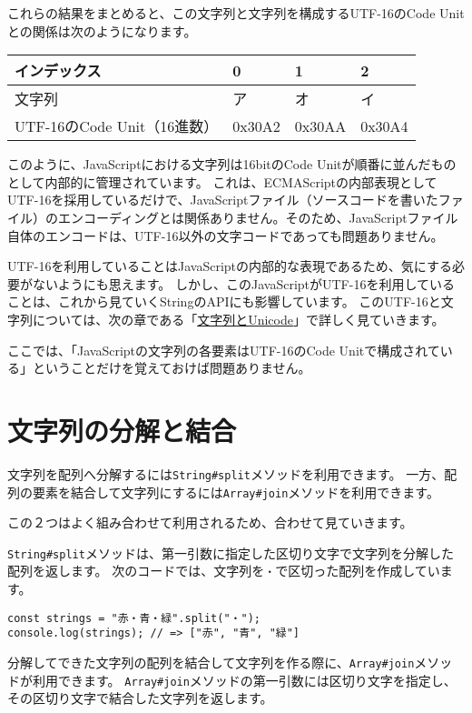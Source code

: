 これらの結果をまとめると、この文字列と文字列を構成するUTF-16のCode
Unitとの関係は次のようになります。

\begin{longtable}[]{@{}llll@{}}
\toprule
インデックス & 0 & 1 & 2\tabularnewline
\midrule
\endhead
文字列 & ア & オ & イ\tabularnewline
UTF-16のCode Unit（16進数） & 0x30A2 & 0x30AA & 0x30A4\tabularnewline
\bottomrule
\end{longtable}

このように、JavaScriptにおける文字列は16bitのCode
Unitが順番に並んだものとして内部的に管理されています。
これは、ECMAScriptの内部表現としてUTF-16を採用しているだけで、JavaScriptファイル（ソースコードを書いたファイル）のエンコーディングとは関係ありません。そのため、JavaScriptファイル自体のエンコードは、UTF-16以外の文字コードであっても問題ありません。

UTF-16を利用していることはJavaScriptの内部的な表現であるため、気にする必要がないようにも思えます。
しかし、このJavaScriptがUTF-16を利用していることは、これから見ていくStringのAPIにも影響しています。
このUTF-16と文字列については、次の章である「\hyperlink{string-unicode}{文字列とUnicode}」で詳しく見ていきます。

ここでは、「JavaScriptの文字列の各要素はUTF-16のCode
Unitで構成されている」ということだけを覚えておけば問題ありません。

\hypertarget{split-join}{%
\section{文字列の分解と結合}\label{split-join}}

文字列を配列へ分解するには\texttt{String\#split}メソッドを利用できます。
一方、配列の要素を結合して文字列にするには\texttt{Array\#join}メソッドを利用できます。

この２つはよく組み合わせて利用されるため、合わせて見ていきます。

\texttt{String\#split}メソッドは、第一引数に指定した区切り文字で文字列を分解した配列を返します。
次のコードでは、文字列を\texttt{・}で区切った配列を作成しています。

\begin{lstlisting}
const strings = "赤・青・緑".split("・");
console.log(strings); // => ["赤", "青", "緑"]
\end{lstlisting}

分解してできた文字列の配列を結合して文字列を作る際に、\texttt{Array\#join}メソッドが利用できます。
\texttt{Array\#join}メソッドの第一引数には区切り文字を指定し、その区切り文字で結合した文字列を返します。

